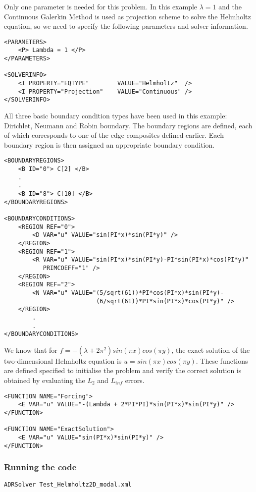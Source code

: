 Only one parameter is needed for this problem. In this example $\lambda = 1$ and
the Continuous Galerkin Method is used as projection scheme to solve the
Helmholtz equation, so we need to specify the following parameters and solver
information.
\begin{lstlisting}[style=XMLStyle]
<PARAMETERS>
    <P> Lambda = 1 </P>
</PARAMETERS>

<SOLVERINFO>
    <I PROPERTY="EQTYPE"        VALUE="Helmholtz"  />
    <I PROPERTY="Projection"    VALUE="Continuous" />
</SOLVERINFO>
\end{lstlisting}

All three basic boundary condition types have been used in this example:
Dirichlet, Neumann and Robin boundary. The boundary regions are defined, each of
which corresponds to one of the edge composites defined earlier. Each boundary
region is then assigned an appropriate boundary condition.
\begin{lstlisting}[style=XMLStyle]
<BOUNDARYREGIONS>
    <B ID="0"> C[2] </B>
    .
    .
    <B ID="8"> C[10] </B>
</BOUNDARYREGIONS>

<BOUNDARYCONDITIONS>
    <REGION REF="0">
        <D VAR="u" VALUE="sin(PI*x)*sin(PI*y)" />
    </REGION>
    <REGION REF="1">
        <R VAR="u" VALUE="sin(PI*x)*sin(PI*y)-PI*sin(PI*x)*cos(PI*y)"
           PRIMCOEFF="1" />
    </REGION>
    <REGION REF="2">
        <N VAR="u" VALUE="(5/sqrt(61))*PI*cos(PI*x)*sin(PI*y)-
                          (6/sqrt(61))*PI*sin(PI*x)*cos(PI*y)" />
    </REGION>
        .
        .
</BOUNDARYCONDITIONS>
\end{lstlisting}

We know that for $f = -(\lambda + 2 \pi^2)sin(\pi x)cos(\pi y)$, the exact
solution of the two-dimensional Helmholtz equation is $u = sin(\pi x)cos(\pi
y)$. These functions are defined specified to initialise the problem and verify
the correct solution is obtained by evaluating the $L_2$ and $L_{inf}$ errors.
\begin{lstlisting}[style=XMLStyle]
<FUNCTION NAME="Forcing">
    <E VAR="u" VALUE="-(Lambda + 2*PI*PI)*sin(PI*x)*sin(PI*y)" />
</FUNCTION>

<FUNCTION NAME="ExactSolution">
    <E VAR="u" VALUE="sin(PI*x)*sin(PI*y)" />
</FUNCTION>
\end{lstlisting}


\subsubsection{Running the code}
\begin{lstlisting}[style=BashInputStyle]
ADRSolver Test_Helmholtz2D_modal.xml
\end{lstlisting}

